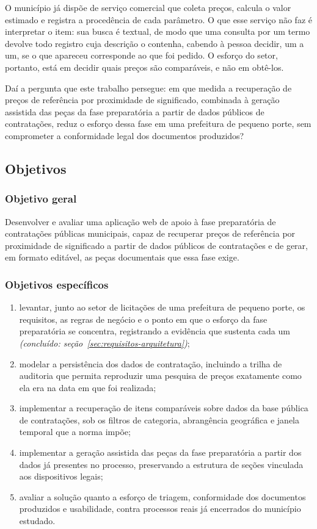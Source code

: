 O município já dispõe de serviço comercial que coleta preços, calcula o valor
estimado e registra a procedência de cada parâmetro. O que esse serviço não faz
é interpretar o item: sua busca é textual, de modo que uma consulta por um termo
devolve todo registro cuja descrição o contenha, cabendo à pessoa decidir, um a
um, se o que apareceu corresponde ao que foi pedido. O esforço do setor, portanto,
está em decidir quais preços são comparáveis, e não em obtê-los.

Daí a pergunta que este trabalho persegue: em que medida a recuperação de preços
de referência por proximidade de significado, combinada à geração assistida das
peças da fase preparatória a partir de dados públicos de contratações, reduz o
esforço dessa fase em uma prefeitura de pequeno porte, sem comprometer a
conformidade legal dos documentos produzidos?

\subsection{Objetivos}

\subsubsection{Objetivo geral}

Desenvolver e avaliar uma aplicação web de apoio à fase preparatória de
contratações públicas municipais, capaz de recuperar preços de referência por
proximidade de significado a partir de dados públicos de contratações e de gerar,
em formato editável, as peças documentais que essa fase exige.

\subsubsection{Objetivos específicos}

\begin{enumerate}
  \item levantar, junto ao setor de licitações de uma prefeitura de pequeno
    porte, os requisitos, as regras de negócio e o ponto em que o esforço da
    fase preparatória se concentra, registrando a evidência que sustenta cada
    um \emph{(concluído: seção~\ref{sec:requisitos-arquitetura})};
  \item modelar a persistência dos dados de contratação, incluindo a trilha de
    auditoria que permita reproduzir uma pesquisa de preços exatamente como ela
    era na data em que foi realizada;
  \item implementar a recuperação de itens comparáveis sobre dados da base
    pública de contratações, sob os filtros de categoria, abrangência
    geográfica e janela temporal que a norma impõe;
  \item implementar a geração assistida das peças da fase preparatória a partir
    dos dados já presentes no processo, preservando a estrutura de seções
    vinculada aos dispositivos legais;
  \item avaliar a solução quanto a esforço de triagem, conformidade dos
    documentos produzidos e usabilidade, contra processos reais já encerrados do
    município estudado.
\end{enumerate}


